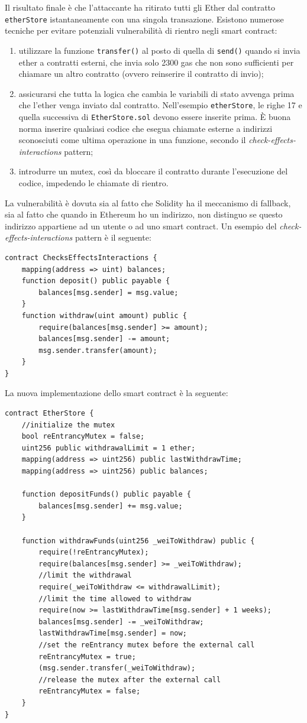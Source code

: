 Il risultato finale è che l'attaccante ha ritirato tutti gli Ether dal contratto \texttt{etherStore} istantaneamente con una singola transazione. Esistono numerose tecniche per evitare potenziali vulnerabilità di rientro negli smart contract:
\begin{enumerate}
    \item utilizzare la funzione \texttt{transfer()} al posto di quella di \texttt{send()} quando si invia ether a contratti esterni, che invia solo 2300 gas che non sono sufficienti per chiamare un altro contratto (ovvero reinserire il contratto di invio);
    \item assicurarsi che tutta la logica che cambia le variabili di stato avvenga prima che l'ether venga inviato dal contratto. Nell'esempio \texttt{etherStore}, le righe 17 e quella successiva di \texttt{EtherStore.sol} devono essere inserite prima. È buona norma inserire qualsiasi codice che esegua chiamate esterne a indirizzi sconosciuti come ultima operazione in una funzione, secondo il \textit{check-effects-interactions} pattern;
    \item introdurre un mutex, così da bloccare il contratto durante l'esecuzione del codice, impedendo le chiamate di rientro.
\end{enumerate}
La vulnerabilità è dovuta sia al fatto che Solidity ha il meccanismo di fallback, sia al fatto che quando in Ethereum ho un indirizzo, non distinguo se questo indirizzo appartiene ad un utente o ad uno smart contract. 
Un esempio del \textit{check-effects-interactions} pattern è il seguente:
\begin{lstlisting}[language=Solidity]
contract ChecksEffectsInteractions {
    mapping(address => uint) balances;
    function deposit() public payable {
        balances[msg.sender] = msg.value;
    }
    function withdraw(uint amount) public {
        require(balances[msg.sender] >= amount);
        balances[msg.sender] -= amount;
        msg.sender.transfer(amount);
    }
}
\end{lstlisting}
La nuova implementazione dello smart contract è la seguente:
\begin{lstlisting}[language=Solidity]
contract EtherStore {
    //initialize the mutex
    bool reEntrancyMutex = false;
    uint256 public withdrawalLimit = 1 ether;
    mapping(address => uint256) public lastWithdrawTime;
    mapping(address => uint256) public balances;
    
    function depositFunds() public payable {
        balances[msg.sender] += msg.value;
    }
    
    function withdrawFunds(uint256 _weiToWithdraw) public {
        require(!reEntrancyMutex);
        require(balances[msg.sender] >= _weiToWithdraw);
        //limit the withdrawal
        require(_weiToWithdraw <= withdrawalLimit);
        //limit the time allowed to withdraw
        require(now >= lastWithdrawTime[msg.sender] + 1 weeks);
        balances[msg.sender] -= _weiToWithdraw;
        lastWithdrawTime[msg.sender] = now;
        //set the reEntrancy mutex before the external call
        reEntrancyMutex = true;
        (msg.sender.transfer(_weiToWithdraw);
        //release the mutex after the external call
        reEntrancyMutex = false;
    }
}
\end{lstlisting}
